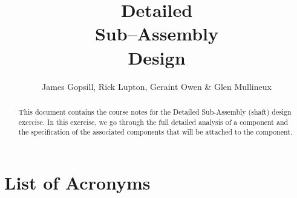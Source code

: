 \documentclass[]{course-notes}
\title{Detailed \\ Sub--Assembly\\ Design}
\author[Gopsill et al.]{\normalsize James Gopsill, Rick Lupton, Geraint Owen \& Glen Mullineux}
\begin{document}
\maketitle

\begin{abstract}
    This document contains the course notes for the Detailed Sub-Assembly (shaft) design exercise. 
    In this exercise, we go through the full detailed analysis of a component and the specification of the associated components that will be attached to the component. 
\end{abstract}

\setcounter{tocdepth}{2}
\tableofcontents
\listoffigures
\listoftables

\section*{List of Acronyms}
\begin{acronym}[TDMA]
\end{acronym}

\clearpage


\clearpage


\clearpage


\clearpage


\clearpage


\clearpage


\clearpage


\clearpage


\clearpage


\clearpage




\appendix

\clearpage


\clearpage

\end{document}
